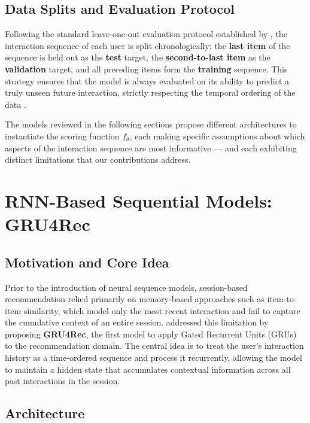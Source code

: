 \documentclass[12pt,a4paper]{report}
\newcommand{\textcite}[1]{\citet{#1}}
\newcommand{\parencite}[1]{\citep{#1}}
\begin{document}
\subsection{Data Splits and Evaluation Protocol}

Following the standard leave-one-out evaluation protocol established
by \textcite{kang2018self}, the interaction sequence of each user is
split chronologically: the \textbf{last item} of the sequence is held
out as the \textbf{test} target, the \textbf{second-to-last item} as
the \textbf{validation} target, and all preceding items form the
\textbf{training} sequence. This strategy ensures that the model is
always evaluated on its ability to predict a truly unseen future
interaction, strictly respecting the temporal ordering of the data
\parencite{wang2019sequential}.

The models reviewed in the following sections propose different
architectures to instantiate the scoring function $f_\theta$,
each making specific assumptions about which aspects of the
interaction sequence are most informative --- and each exhibiting
distinct limitations that our contributions address.

\section{RNN-Based Sequential Models: GRU4Rec}

\subsection{Motivation and Core Idea}

Prior to the introduction of neural sequence models, session-based
recommendation relied primarily on memory-based approaches such as
item-to-item similarity, which model only the most recent interaction
and fail to capture the cumulative context of an entire session.
\textcite{hidasi2016gru4rec} addressed this limitation by proposing
\textbf{GRU4Rec}, the first model to apply Gated Recurrent Units
(GRUs) to the recommendation domain. The central idea is to treat
the user's interaction history as a time-ordered sequence and process
it recurrently, allowing the model to maintain a hidden state that
accumulates contextual information across all past interactions in
the session.

\subsection{Architecture}
\end{document}
